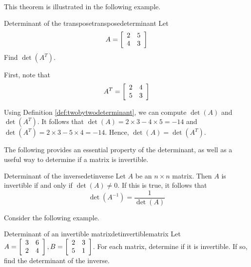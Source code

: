 This theorem is illustrated in the following example. 

\begin{example}{Determinant of the transpose}{transposedeterminant}
Let
\begin{equation*}
A
=
\left[
\begin{array}{rr}
2 & 5 \\
4 & 3
\end{array}
\right]
\end{equation*}
Find $\det \left(A^T\right)$.
\end{example}

\begin{solution}
First, note that 
\begin{equation*}
A^{T}
=
\left[
\begin{array}{rr}
2 & 4 \\
5 & 3
\end{array}
\right]
\end{equation*}

Using Definition \ref{def:twobytwodeterminant}, we can compute $\det \left(A\right)$ and $\det \left(A^T\right)$. It follows that
$\det \left(A\right) = 2 \times 3 - 4 \times 5 = -14$ and $\det \left(A^T\right) = 2 \times 3 - 5 \times 4 = -14$. 
Hence, $\det \left(A\right) = \det \left(A^T\right)$.
\end{solution}

The following provides an essential property of the determinant, as well as a useful way to determine if a matrix is invertible.

\begin{theorem}{Determinant of the inverse}{detinverse}
Let $A$ be an $n \times n$ matrix. Then $A$ is invertible if and only if $\det(A) \neq 0$. If this is true, it follows that 
\[
\det(A^{-1}) = \frac{1}{\det(A)}
\]
\end{theorem}

Consider the following example.

\begin{example}{Determinant of an invertible matrix}{detinvertiblematrix}
Let $A = \left[ \begin{array}{rr}
3 & 6 \\
2 & 4 
\end{array} \right], B = \left[ \begin{array}{rr}
2 & 3 \\
5 & 1
\end{array} \right]$. For each matrix, determine if it is invertible. If so, find the determinant of the inverse. 
\end{example}

